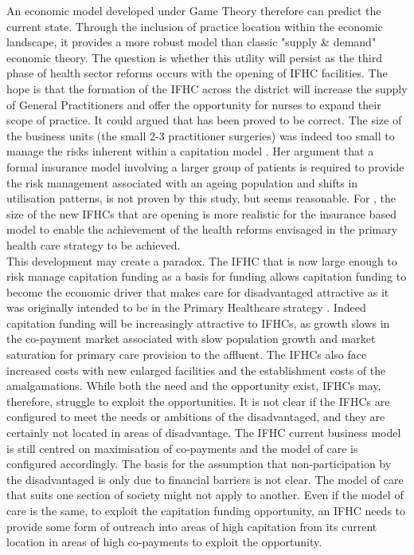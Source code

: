 \documentclass[11pt,a4paper]{article}
\begin{document}
An economic model developed under Game Theory therefore can predict the current state. Through the inclusion of practice location within the economic landscape, it provides a more robust model than classic "supply \& demand" economic theory. The question is whether this utility will persist as the third phase of health sector reforms occurs with the opening of IFHC facilities. The hope is that the formation of the IFHC across the district will increase the supply of General Practitioners and offer the opportunity for nurses to expand their scope of practice. It could argued that \citet{howell2005restructuring} has been proved to be correct. The size of the business units (the small 2-3 practitioner surgeries) was indeed too small to manage the risks inherent within a capitation model \citep{howell2005restructuring}. Her argument that a formal insurance model involving a larger group of patients is required to provide the risk management associated with an ageing population and shifts in utilisation patterns, is not proven by this study, but seems reasonable. For \citet{howell2005restructuring}, the size of the new IFHCs that are opening is more realistic for the insurance based model to enable the achievement of the health reforms envisaged in the primary health care strategy to be achieved.\\


This development may create a paradox. The IFHC that is now large enough to risk manage capitation funding as a basis for funding allows capitation funding to become the economic driver that makes care for disadvantaged attractive as it was originally intended to be in the Primary Healthcare strategy \citep{king2001primary}. Indeed capitation funding will be increasingly attractive to IFHCs, as growth slows in the co-payment market associated with slow population growth and market saturation for primary care provision to the affluent. The IFHCs also face increased costs with new enlarged facilities and the establishment costs of the amalgamations. While both the need and the opportunity exist, IFHCs may, therefore, struggle to exploit the opportunities. It is not clear if the IFHCs are configured to meet the needs or ambitions of the disadvantaged, and they are certainly not located in areas of disadvantage. The IFHC current business model is still centred on maximisation of co-payments and the model of care is configured accordingly. The basis for the assumption that non-participation by the disadvantaged is only due to financial barriers is not clear. The model of care that suits one section of society might not apply to another. Even if the model of care is the same, to exploit the capitation funding opportunity, an IFHC needs to provide some form of outreach into areas of high capitation from its current location in areas of high co-payments to exploit the opportunity.\\
\end{document}
